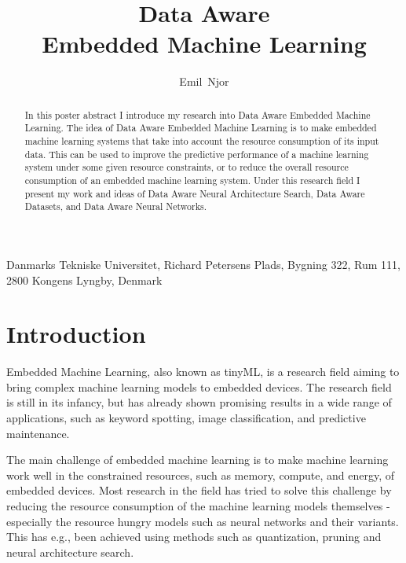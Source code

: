 \documentclass{acaces}
\begin{document}
\title{Data Aware\\Embedded Machine Learning
}

\author{
    Emil~Njor
}

\address{1}{
    Danmarks Tekniske Universitet,
    Richard Petersens Plads,
    Bygning 322,
    Rum 111,
    2800 Kongens Lyngby,
    Denmark
}


\pagestyle{empty}


\begin{abstract}
    In this poster abstract I introduce my research into Data Aware Embedded Machine Learning.
    The idea of Data Aware Embedded Machine Learning is to make embedded machine learning systems that take into account the resource consumption of its input data.
    This can be used to improve the predictive performance of a machine learning system under some given resource constraints, or to reduce the overall resource consumption of an embedded machine learning system.
    Under this research field I present my work and ideas of Data Aware Neural Architecture Search, Data Aware Datasets, and Data Aware Neural Networks.
\end{abstract}


\section{Introduction}
Embedded Machine Learning, also known as tinyML, is a research field aiming to bring complex machine learning models to embedded devices. 
The research field is still in its infancy, but has already shown promising results in a wide range of applications, such as keyword spotting, image classification, and predictive maintenance.

The main challenge of embedded machine learning is to make machine learning work well in the constrained resources, such as memory, compute, and energy, of embedded devices.
Most research in the field has tried to solve this challenge by reducing the resource consumption of the machine learning models themselves - especially the resource hungry models such as neural networks and their variants.
This has e.g., been achieved using methods such as quantization, pruning and neural architecture search\cite{njor2022primer}.
\end{document}
